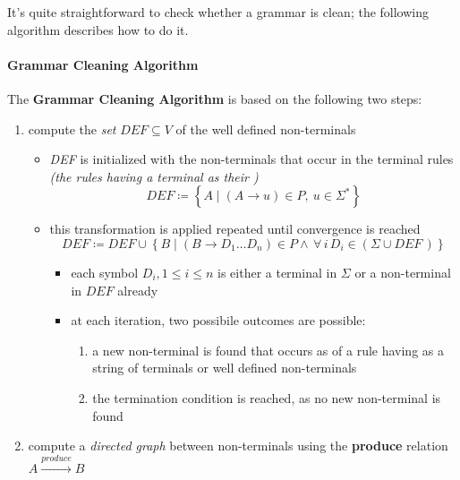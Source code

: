 \documentclass[english]{article}
\begin{document}
It's quite straightforward to check whether a grammar is clean;
the following algorithm describes how to do it.

\paragraph{Grammar Cleaning Algorithm}

The \textbf{Grammar Cleaning Algorithm} is based on the following two steps:

\begin{enumerate}[label=\textbf{step \arabic*}:, ref=(\textbf{\arabic*}), left=20pt]
  \item compute the \textit{set} \(\textit{DEF} \subseteq V\) of the well defined non-terminals
        \begin{itemize}
          \item \textit{DEF} is initialized with the non-terminals that occur in the terminal rules \textit{(the rules having a terminal as their \RP)}
                \[ \textit{DEF} \coloneqq \left\{ A \mid (A \rightarrow u) \in P, \ u \in \Sigma^\ast  \right\} \]
          \item this transformation is applied repeated until convergence is reached
                \[ \textit{DEF} \coloneqq \textit{DEF} \cup \left\{ B \mid (B \rightarrow D_1 \ldots D_n) \in P \land \, \forall \, i \, D_i \in \left(\Sigma \cup \textit{DEF} \,\right)\right\} \]
                \begin{itemize}
                  \item each symbol \(D_i, 1 \leq i \leq n\) is either a terminal in \(\Sigma\) or a non-terminal in \(\textit{DEF}\) already
                  \item at each iteration, two possibile outcomes are possible:
                        \begin{enumerate}
                          \item a new non-terminal is found that occurs as \LP of a rule having as \RP a string of terminals or well defined non-terminals
                          \item the termination condition is reached, as no new non-terminal is found
                        \end{enumerate}
                \end{itemize}
        \end{itemize}
  \item compute a \textit{directed graph} between non-terminals using the \textbf{produce} relation \(A \xrightarrow{produce} B\)

\end{enumerate}
\end{document}
